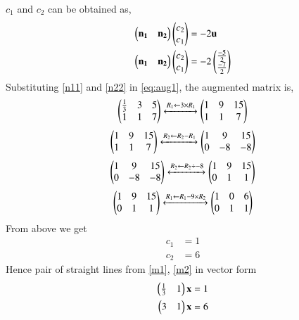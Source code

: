 \documentclass[journal,12pt,twocolumn]{IEEEtran}
\begin{document}
$c_1$ and $c_2$ can be obtained as,
\begin{align}
\begin{pmatrix}\mathbf{n_1} & \mathbf{n_2}\end{pmatrix}\begin{pmatrix}c_2\\c_1\end{pmatrix}&=-2\mathbf{u}\\
\begin{pmatrix}\mathbf{n_1} & \mathbf{n_2}\end{pmatrix}\begin{pmatrix}c_2\\c_1\end{pmatrix}&=-2\begin{pmatrix}\frac{-5}{2}\\\frac{-7}{2}\end{pmatrix}
\label{eq:aug1}
\end{align}
Substituting \eqref{n11} and \eqref{n22} in \eqref{eq:aug1}, the augmented matrix is,
\begin{align}
\begin{pmatrix}\frac{1}{3} & 3& 5 \\ 1 & 1 & 7\end{pmatrix}
\xleftrightarrow[]{R_1 \leftarrow 3\times R_1}
\begin{pmatrix}1 & 9&15\\ 1 & 1 & 7\end{pmatrix}
\end{align}
\begin{align}
\begin{pmatrix}1 & 9&15\\ 1 & 1 & 7\end{pmatrix}
\xleftrightarrow[]{R_2 \leftarrow R_2- R_1}
\begin{pmatrix}1 & 9&15\\ 0 & -8 & -8\end{pmatrix}
\end{align}
\begin{align}
\begin{pmatrix}1 & 9&15\\ 0 & -8 & -8\end{pmatrix}
\xleftrightarrow[]{R_2 \leftarrow R_2\div -8}
\begin{pmatrix}1 & 9&15\\ 0 & 1 & 1\end{pmatrix}
\end{align}
\begin{align}
\begin{pmatrix}1 & 9&15\\ 0 & 1 & 1\end{pmatrix}
\xleftrightarrow[]{R_1 \leftarrow R_1-9\times R_2}
\begin{pmatrix}1 & 0&6\\ 0 & 1&1 \end{pmatrix}
\end{align}
From above  we get 
\begin{align}
    c_1&=1\\
    c_2&=6
\end{align}
Hence pair of straight lines  from  \eqref{m1}, \eqref{m2} in vector form
\begin{align}
    \begin{pmatrix}\frac{1}{3}& 1\end{pmatrix}\mathbf{x}&=1\\
    \begin{pmatrix}3 & 1\end{pmatrix}\mathbf{x}&=6
\end{align}
\end{document}
